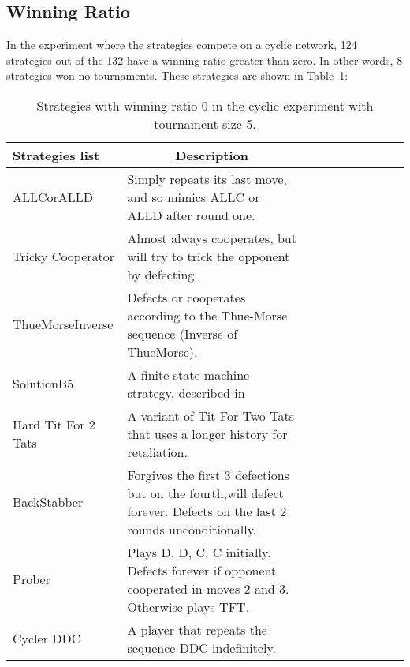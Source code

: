 \subsection{Winning Ratio}
\label{sub:winning-ratio}
In the experiment where the strategies compete on a cyclic network, 124 strategies
out of the 132 have a winning ratio greater than zero. In other words, 8 strategies
won no tournaments. These strategies are shown in Table~\ref{winning-ratio-zero-cyclic-five}:

\begin{table}[h]
	\centering
	\begin{adjustbox}{width=1\textwidth}
		\small
		\begin{tabular}{@{}|l|l|l|l|l|l|l|l|l|l|@{}}
			\hline
			Strategies list     & \multicolumn{1}{c|}{Description}                                                                                     \\ \hline
			ALLCorALLD          & Simply repeats its last move, and so mimics ALLC or ALLD after round one.                                            \\ \hline
			Tricky Cooperator   & Almost always cooperates, but will try to trick the opponent by defecting.                                           \\ \hline
			ThueMorseInverse    & Defects or cooperates according to the Thue-Morse sequence (Inverse of ThueMorse).                                   \\ \hline
			SolutionB5          & A finite state machine strategy, described in~\cite{Ashlock2015}                               \\ \hline
			Hard Tit For 2 Tats & A variant of Tit For Two Tats that uses a longer history for retaliation.                                            \\ \hline
			BackStabber         & Forgives the first 3 defections but on the fourth,will defect forever. Defects on the last 2 rounds unconditionally. \\ \hline
			Prober              & Plays D, D, C, C initially. Defects forever if opponent cooperated in moves 2 and 3. Otherwise plays TFT.            \\ \hline
			Cycler DDC          & A player that repeats the sequence DDC indefinitely.                                                                 \\ \hline
		\end{tabular}
	\end{adjustbox}
	\caption{Strategies with winning ratio 0 in the cyclic experiment with tournament
	size 5.}
	\label{winning-ratio-zero-cyclic-five}
\end{table}

